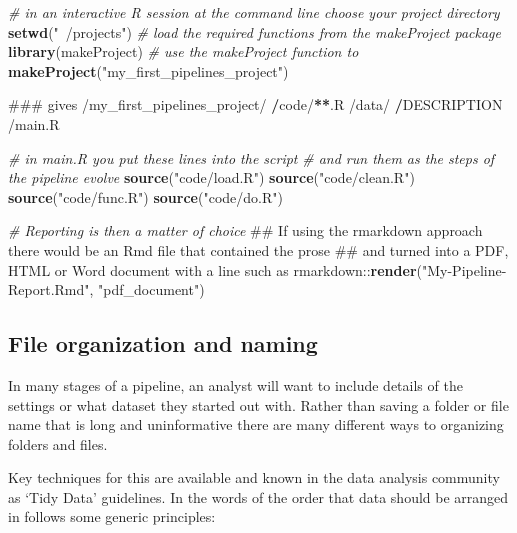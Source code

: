 \documentclass[11pt,a4paper]{article}
\newenvironment{Shaded}{\begin{snugshade}}{\end{snugshade}}
\newcommand{\KeywordTok}[1]{\textcolor[rgb]{0.13,0.29,0.53}{\textbf{{#1}}}}
\newcommand{\StringTok}[1]{\textcolor[rgb]{0.31,0.60,0.02}{{#1}}}
\newcommand{\CommentTok}[1]{\textcolor[rgb]{0.56,0.35,0.01}{\textit{{#1}}}}
\newcommand{\ErrorTok}[1]{\textbf{{#1}}}
\newcommand{\NormalTok}[1]{{#1}}
\begin{document}
\begin{Shaded}
\begin{Highlighting}[]
\CommentTok{# in an interactive R session at the command line choose your project directory}
\KeywordTok{setwd}\NormalTok{(}\StringTok{"~/projects"}\NormalTok{)   }
\CommentTok{# load the required functions from the makeProject package}
\KeywordTok{library}\NormalTok{(makeProject)}
\CommentTok{# use the makeProject function to }
\KeywordTok{makeProject}\NormalTok{(}\StringTok{"my_first_pipelines_project"}\NormalTok{)}

\NormalTok{### gives}
\NormalTok{/my_first_pipelines_project/}
\StringTok{    }\ErrorTok{/}\NormalTok{code/}\ErrorTok{**}\NormalTok{.R}
    \NormalTok{/data/}
\StringTok{    }\ErrorTok{/}\NormalTok{DESCRIPTION}
    \NormalTok{/main.R}

\CommentTok{# in main.R you put these lines into the script}
\CommentTok{# and run them as the steps of the pipeline evolve}
\KeywordTok{source}\NormalTok{(}\StringTok{"code/load.R"}\NormalTok{)}
\KeywordTok{source}\NormalTok{(}\StringTok{"code/clean.R"}\NormalTok{)}
\KeywordTok{source}\NormalTok{(}\StringTok{"code/func.R"}\NormalTok{)}
\KeywordTok{source}\NormalTok{(}\StringTok{"code/do.R"}\NormalTok{)}

\CommentTok{# Reporting is then a matter of choice}
\NormalTok{## If using the rmarkdown approach there would be an Rmd file that contained the prose}
\NormalTok{## and turned into a PDF, HTML or Word document with a line such as }
\NormalTok{rmarkdown::}\KeywordTok{render}\NormalTok{(}\StringTok{"My-Pipeline-Report.Rmd"}\NormalTok{, }\StringTok{"pdf_document"}\NormalTok{)}
\end{Highlighting}
\end{Shaded}

\subsection{File organization and
naming}\label{file-organization-and-naming}

In many stages of a pipeline, an analyst will want to include details of
the settings or what dataset they started out with. Rather than saving a
folder or file name that is long and uninformative there are many
different ways to organizing folders and files.

Key techniques for this are available and known in the data analysis
community as `Tidy Data' guidelines. In the words of \citet{WickhamRstudio2014} the
order that data should be arranged in follows some generic principles:
\end{document}
